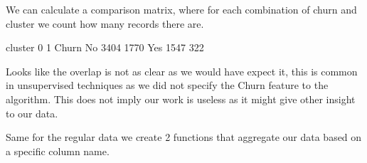 \documentclass[letterpaper,10pt,english]{jupyterBook}
\begin{document}
\sphinxAtStartPar
We can calculate a comparison matrix, where for each combination of churn and cluster we count how many records there are.

\begin{sphinxVerbatim}[commandchars=\\\{\}]
\PYG{p}{[}\PYG{p}{]}
\end{sphinxVerbatim}

\begin{sphinxVerbatim}[commandchars=\\\{\}]
cluster     0     1
Churn              
No       3404  1770
Yes      1547   322
\end{sphinxVerbatim}

\sphinxAtStartPar
Looks like the overlap is not as clear as we would have expect it, this is common in unsupervised techniques as we did not specify the Churn feature to the algorithm. This does not imply our work is useless as it might give other insight to our data.

\sphinxAtStartPar
Same for the regular data we create 2 functions that aggregate our data based on a specific column name.

\begin{sphinxVerbatim}[commandchars=\\\{\}]
 
     \PYG{p}{[} \PYG{p}{]}

 
      \PYG{p}{[} \PYG{p}{]}
     
\end{sphinxVerbatim}
\end{document}
